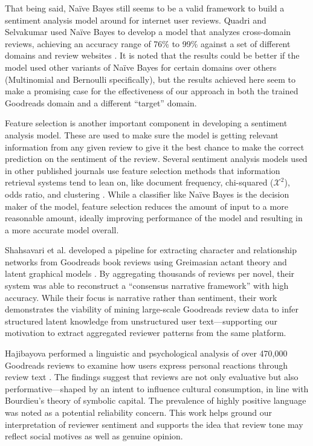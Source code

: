 That being said, Na\"ive Bayes still seems to be a valid framework to build a sentiment analysis model around for
internet user reviews. Quadri and Selvakumar used Na\"ive Bayes to develop a model that analyzes cross-domain
reviews, achieving an accuracy range of 76\% to 99\% against a set of different domains and review websites 
\cite{Quadri2020}. It is noted that the results could be better if the model used other variants of Na\"ive Bayes
for certain domains over others (Multinomial and Bernoulli specifically), but the results achieved here seem to make
a promising case for the effectiveness of our approach in both the trained Goodreads domain and a different
``target'' domain.

Feature selection is another important component in developing a sentiment analysis model. These are used to make
sure the model is getting relevant information from any given review to give it the best chance to make the correct
prediction on the sentiment of the review. Several sentiment analysis models used in other published journals use
feature selection methods that information retrieval systems tend to lean on, like document frequency, chi-squared ($\mathcal{X}^2$),
odds ratio, and clustering \cite{Hung2015}. While a classifier like Na\"ive Bayes is the decision maker of the model, feature selection
reduces the amount of input to a more reasonable amount, ideally improving performance of the model and resulting
in a more accurate model overall.

Shahsavari et al. developed a pipeline for extracting character and relationship networks from Goodreads book reviews using Greimasian actant theory and latent graphical models \cite{shahsavari2020}. By aggregating thousands of reviews per novel, their system was able to reconstruct a “consensus narrative framework” with high accuracy. While their focus is narrative rather than sentiment, their work demonstrates the viability of mining large-scale Goodreads review data to infer structured latent knowledge from unstructured user text—supporting our motivation to extract aggregated reviewer patterns from the same platform.

Hajibayova performed a linguistic and psychological analysis of over 470,000 Goodreads reviews to examine how users express personal reactions through review text \cite{hajibayova2019}. The findings suggest that reviews are not only evaluative but also performative—shaped by an intent to influence cultural consumption, in line with Bourdieu’s theory of symbolic capital. The prevalence of highly positive language was noted as a potential reliability concern. This work helps ground our interpretation of reviewer sentiment and supports the idea that review tone may reflect social motives as well as genuine opinion.
